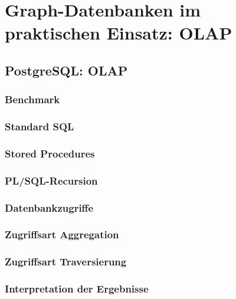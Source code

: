 \chapter{Graph-Datenbanken im praktischen Einsatz: OLAP}
\section{PostgreSQL: OLAP}
\subsection{Benchmark}
\subsection{Standard SQL}
\subsection{Stored Procedures}
\subsection{PL/SQL-Recursion}
\subsection{Datenbankzugriffe}
\subsection{Zugriffsart Aggregation}
\subsection{Zugriffsart Traversierung}
\subsection{Interpretation der Ergebnisse}